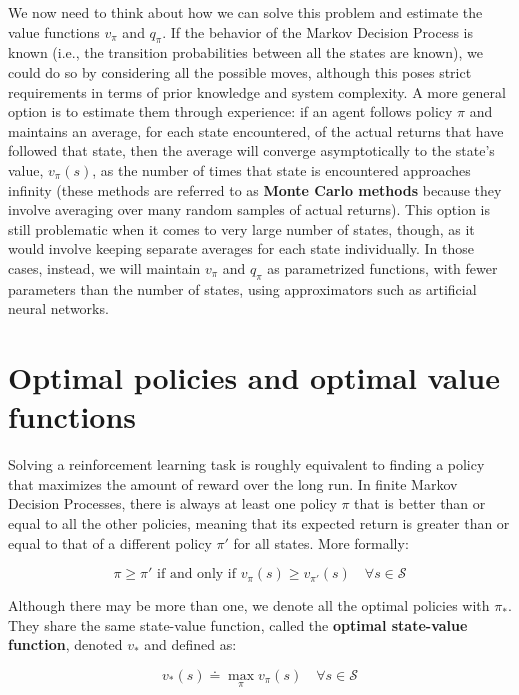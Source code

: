 We now need to think about how we can solve this problem and estimate the value functions $v_\pi$ and $q_\pi$. If the behavior of the Markov Decision Process is known (i.e., the transition probabilities between all the states are known), we could do so by considering all the possible moves, although this poses strict requirements in terms of prior knowledge and system complexity. A more general option is to estimate them through experience: if an agent follows policy $\pi$ and maintains an average, for each state encountered, of the actual returns that have followed that state, then the average will converge asymptotically to the state’s value, $v_\pi(s)$, as the number of times that state is encountered approaches infinity (these methods are referred to as \textbf{Monte Carlo methods} because they involve averaging over many random samples of actual returns). This option is still problematic when it comes to very large number of states, though, as it would involve keeping separate averages for each state individually. In those cases, instead, we will maintain $v_\pi$ and $q_\pi$ as parametrized functions, with fewer parameters than the number of states, using approximators such as artificial neural networks.

\section{Optimal policies and optimal value functions}
Solving a reinforcement learning task is roughly equivalent to finding a policy that maximizes the amount of reward over the long run. In finite Markov Decision Processes, there is always at least one policy $\pi$ that is better than or equal to all the other policies, meaning that its expected return is greater than or equal to that of a different policy $\pi'$ for all states. More formally:

\begin{equation*}
    \pi \ge \pi' \text{ if and only if } v_\pi(s) \ge v_{\pi'} (s) \quad \forall s \in \mathcal{S}
\end{equation*}

Although there may be more than one, we denote all the optimal policies with $\pi_*$. They share the same state-value function, called the \textbf{optimal state-value function}, denoted $v_*$ and defined as:

\begin{equation}
    v_*(s) \doteq \max_\pi v_\pi(s) \quad \forall s \in \mathcal{S}
    \label{eq:ch2-optimalstatevaluefunction}
\end{equation}

